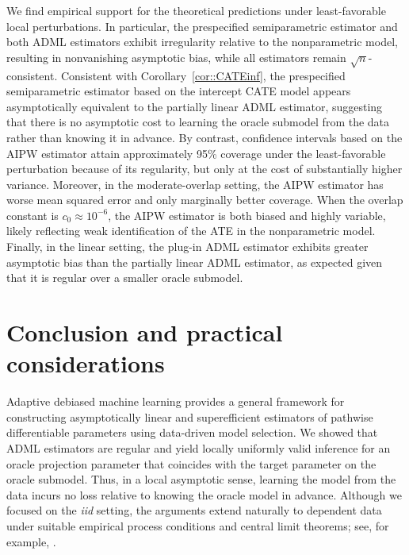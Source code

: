 \documentclass[11pt]{article}
\theoremstyle{definition}
\begin{document}
We find empirical support for the theoretical predictions under least-favorable local perturbations. In particular, the prespecified semiparametric estimator and both ADML estimators exhibit irregularity relative to the nonparametric model, resulting in nonvanishing asymptotic bias, while all estimators remain \(\sqrt{n}\)-consistent. Consistent with Corollary~\ref{cor::CATEinf}, the prespecified semiparametric estimator based on the intercept CATE model appears asymptotically equivalent to the partially linear ADML estimator, suggesting that there is no asymptotic cost to learning the oracle submodel from the data rather than knowing it in advance. By contrast, confidence intervals based on the AIPW estimator attain approximately 95\% coverage under the least-favorable perturbation because of its regularity, but only at the cost of substantially higher variance. Moreover, in the moderate-overlap setting, the AIPW estimator has worse mean squared error and only marginally better coverage. When the overlap constant is \(c_0 \approx 10^{-6}\), the AIPW estimator is both biased and highly variable, likely reflecting weak identification of the ATE in the nonparametric model. Finally, in the linear setting, the plug-in ADML estimator exhibits greater asymptotic bias than the partially linear ADML estimator, as expected given that it is regular over a smaller oracle submodel.


\section{Conclusion and practical considerations}

Adaptive debiased machine learning provides a general framework for constructing asymptotically linear and superefficient estimators of pathwise differentiable parameters using data-driven model selection. We showed that ADML estimators are regular and yield locally uniformly valid inference for an oracle projection parameter that coincides with the target parameter on the oracle submodel. Thus, in a local asymptotic sense, learning the model from the data incurs no loss relative to knowing the oracle model in advance. Although we focused on the \emph{iid} setting, the arguments extend naturally to dependent data under suitable empirical process conditions and central limit theorems; see, for example, \cite{van2014causal}.
\end{document}
